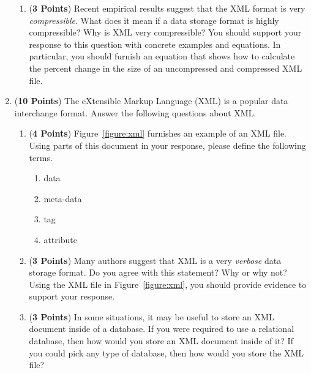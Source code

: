 \documentclass[12pt]{article}
\begin{document}
\begin{enumerate}
\begin{enumerate}
    \item ({\bf 3 Points}) Recent empirical results suggest that the
      XML format is very {\em compressible}.  What does it mean if a
      data storage format is highly compressible?  Why is XML very
      compressible?  You should support your response to this question
      with concrete examples and equations.  In particular, you should
      furnish an equation that shows how to calculate the percent
      change in the size of an uncompressed and compressed XML file.

    \end{enumerate}

\newpage

\item ({\bf 10 Points}) The eXtensible Markup Language (XML) is a
  popular data interchange format.  Answer the following questions
  about XML.

  \begin{enumerate}
    
    \item ({\bf 4 Points}) Figure~\ref{figure:xml} furnishes an
      example of an XML file.  Using parts of this document in your
      response, please define the following terms.

      \begin{enumerate}

        \item data

        \item meta-data

        \item tag

        \item attribute

      \end{enumerate}

  \item ({\bf 3 Points}) Many authors suggest that XML is a very {\em
    verbose} data storage format.  Do you agree with this statement?
    Why or why not? Using the XML file in Figure~\ref{figure:xml}, you
    should provide evidence to support your response.

  \item ({\bf 3 Points}) In some situations, it may be useful to store
    an XML document inside of a database.  If you were required to use
    a relational database, then how would you store an XML document
    inside of it?  If you could pick any type of database, then how
    would you store the XML file?


\end{enumerate}
\end{enumerate}
\end{document}
